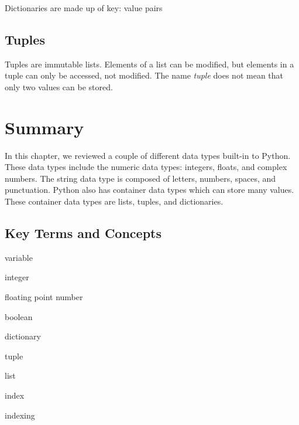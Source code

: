\documentclass{book}
\newenvironment{key_terms}{\begin{multicols}{3}}{\end{multicols}} %
\begin{document}
    
        Dictionaries are made up of key: value pairs
    




    
        \subsection{Tuples}\label{tuples}
    




    
        Tuples are immutable lists. Elements of a list can be modified, but
elements in a tuple can only be accessed, not modified. The name
\emph{tuple} does not mean that only two values can be stored.
    




    
        \newpage
        \section{Summary}\label{summary}

    




    
        In this chapter, we reviewed a couple of different data types built-in
to Python. These data types include the numeric data types: integers,
floats, and complex numbers. The string data type is composed of
letters, numbers, spaces, and punctuation. Python also has container
data types which can store many values. These container data types are
lists, tuples, and dictionaries.
    




    
        \subsection{Key Terms and Concepts}\label{key-terms-and-concepts}
    




    
        \begin{key_terms}
        variable

integer

floating point number

boolean

dictionary

tuple

list

index

indexing
        \end{key_terms}
\end{document}
